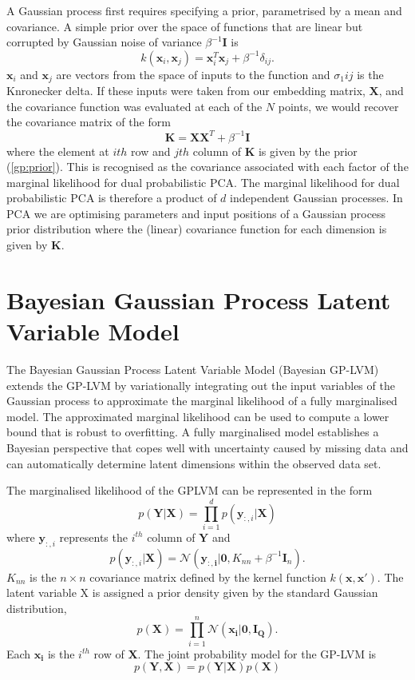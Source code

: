 \documentclass[ %
                    author={Dillon Keith Diep [INCOMPLETE DRAFT, NOT FOR SUBMISSION]},
                supervisor={Dr. Carl Henrik Ek},
                    degree={MEng},
                     title={ARt-CG:},
                  subtitle={Assisted Real-time Content Generation of 3D Hair by Learning Manifolds},
                      type={Research},
                      year={2014} ]{dissertation}
\begin{document}
A Gaussian process first requires specifying a prior, parametrised by a mean and covariance.
A simple prior over the space of functions that are linear but corrupted by Gaussian noise of variance $\beta^{-1}\mathbf{I}$ is
\begin{equation} \label{gp:prior}
	k(\mathbf{x}_i,\mathbf{x}_j)=\mathbf{x}^T_i\mathbf{x}_j+\beta^{-1}\delta_{ij}.
\end{equation}
$\mathbf{x}_i$ and $\mathbf{x}_j$ are vectors from the space of inputs to the function and $\sigma_1{ij}$ is the Knronecker delta. If these inputs were taken from our embedding matrix, $\mathbf{X}$, and the covariance function was evaluated at each of the $N$ points, we would recover the covariance matrix of the form
$$\mathbf{K=XX}^T+\beta^{-1}\mathbf{I}$$
where the element at $ith$ row and $jth$ column of $\mathbf{K}$ is given by the prior (\ref{gp:prior}). This is recognised as the covariance associated with each factor of the marginal likelihood for dual probabilistic PCA. The marginal likelihood for dual probabilistic PCA is therefore a product of $d$ independent Gaussian processes. In PCA we are optimising parameters and input positions of a Gaussian process prior distribution where the (linear) covariance function for each dimension is given by $\mathbf{K}$.

\section{Bayesian Gaussian Process Latent Variable Model}
The Bayesian Gaussian Process Latent Variable Model (Bayesian GP-LVM) \cite{bgplvm} extends the GP-LVM by variationally integrating out the input variables of the Gaussian process to approximate the marginal likelihood of a fully marginalised model. The approximated marginal likelihood can be used to compute a lower bound that is robust to overfitting. A fully marginalised model establishes a Bayesian perspective that copes well with uncertainty caused by missing data and can automatically determine latent dimensions within the observed data set.

The marginalised likelihood of the GPLVM can be represented in the form
$$p(\mathbf{Y|X})=\prod^d_{i=1}p(\mathbf{y}_{:,i}|\mathbf{X})$$
where $\mathbf{y}_{:,i}$ represents the $i^{th}$ column of $\mathbf{Y}$ and
$$p(\mathbf{y}_{:,i}|\mathbf{X})=\mathcal{N}(\mathbf{y_{:,i}|0},K_{nn}+\beta^{-1}\mathbf{I}_n).$$
$K_{nn}$ is the $n \times n$ covariance matrix defined by the kernel function $k(\mathbf{x,x'})$.
The latent variable X is assigned a prior density given by the standard Gaussian distribution, 
$$p(\mathbf{X})=\prod^n_{i=1}\mathcal{N}(\mathbf{x_i|0, I_Q}).$$
Each $\mathbf{x_i}$ is the $i^{th}$ row of $\mathbf{X}$. The joint probability model for the GP-LVM is
$$p(\mathbf{Y,X})=p(\mathbf{Y|X})p(\mathbf{X})$$
\end{document}
